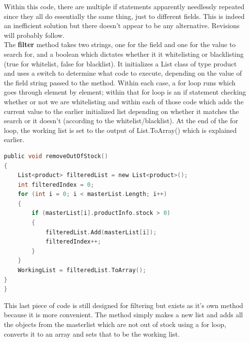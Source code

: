 ﻿\documentclass{article}
\begin{document}
    Within this code, there are multiple if statements apparently needlessly repeated since they all do essentially the same thing, just to different fields.
    This is indeed an inefficient solution but there doesn't appear to be any alternative.
    Revisions will probably follow.
    \\
    The \textbf{filter} method takes two strings, one for the field and one for the value to search for, and a boolean which dictates whether it it whitelisting or blacklisting (true for whitelist, false for blacklist).
    It initializes a List class of type product and uses a switch to determine what code to execute, depending on the value of the field string passed to the method.
    Within each case, a for loop runs which goes through element by element; within that for loop is an if statement checking whether or not we are whitelisting and within each of those code which adds the current value to the earlier initialized list depending on whether it matches the search or it doesn't (according to the whitelist/blacklist).
    At the end of the for loop, the working list is set to the output of List.ToArray() which is explained earlier.
    \begin{lstlisting}[language=C]
public void removeOutOfStock()
{
    List<product> filteredList = new List<product>();
    int filteredIndex = 0;
    for (int i = 0; i < masterList.Length; i++)
    {
        if (masterList[i].productInfo.stock > 0)
        {
            filteredList.Add(masterList[i]);
            filteredIndex++;
        }
    }
    WorkingList = filteredList.ToArray();
}
}
    \end{lstlisting}
    This last piece of code is still designed for filtering but exists as it's own method because it is more convenient.
    The method simply makes a new list and adds all the objects from the masterlist which are not out of stock using a for loop, converts it to an array and sets that to be the working list.
    \newpage
\end{document}
